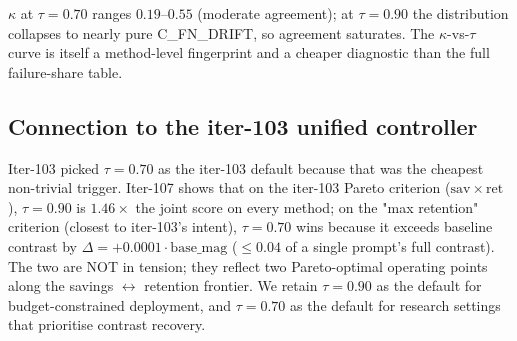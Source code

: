 $\kappa$ at $\tau{=}0.70$ ranges $0.19$--$0.55$ (moderate agreement);
at $\tau{=}0.90$ the distribution collapses to nearly pure C\_FN\_DRIFT,
so agreement saturates.  The $\kappa$-vs-$\tau$ curve is itself a
method-level fingerprint and a cheaper diagnostic than the full
failure-share table.

\subsection{Connection to the iter-103 unified controller}

Iter-103 picked $\tau{=}0.70$ as the iter-103 default because that was
the cheapest non-trivial trigger.  Iter-107 shows that on the iter-103
Pareto criterion ($\mathrm{sav} \times \mathrm{ret}$), $\tau{=}0.90$ is
$1.46\times$ the joint score on every method; on the "max retention"
criterion (closest to iter-103's intent), $\tau{=}0.70$ wins because it
exceeds baseline contrast by $\Delta = +0.0001 \cdot \mathrm{base\_mag}$
($\le 0.04$ of a single prompt's full contrast).  The two are NOT in
tension; they reflect two Pareto-optimal operating points along the
savings $\leftrightarrow$ retention frontier.  We retain $\tau{=}0.90$ as
the default for budget-constrained deployment, and $\tau{=}0.70$ as the
default for research settings that prioritise contrast recovery.
